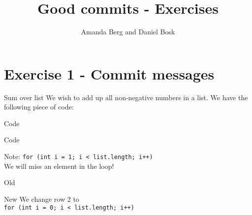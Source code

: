 \title{%
  Good commits - Exercises
}
\author{Amanda Berg and Daniel Bosk}


\mode*


\section{Exercise 1 - Commit messages}
\begin{frame}
\begin{block}{Sum over list}
    We wish to add up all non-negative numbers in a list. We have the following piece of code:
\end{block}
\begin{block}{Code}
    
\end{block}
\end{frame}

\begin{frame}
\begin{block}{Code}
    
\end{block}

\begin{alertblock}{Note:}
    \lstinline{for (int i = 1; i < list.length; i++)}\\
    We will miss an element in the loop!
\end{alertblock}
\end{frame}


\begin{frame}
\begin{block}{Old}
    
\end{block}

\begin{block}{New}
    We change row 2 to \\
    \lstinline{for (int i = 0; i < list.length; i++)}
\end{block}
\end{frame}

